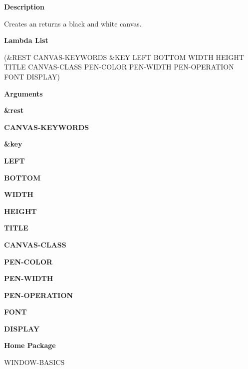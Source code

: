  
{\bf Description}

Creates an returns a black and white canvas.

 
{\bf Lambda List}

(\&REST CANVAS-KEYWORDS \&KEY LEFT BOTTOM WIDTH HEIGHT TITLE CANVAS-CLASS PEN-COLOR PEN-WIDTH PEN-OPERATION FONT DISPLAY)

 
{\bf Arguments}


\beginhang
{\bf \&rest}\hspace{2em}
 
{\bf CANVAS-KEYWORDS}


 
\endhang
\beginhang
{\bf \&key}\hspace{2em}
 
{\bf LEFT}


 
{\bf BOTTOM}


 
{\bf WIDTH}


 
{\bf HEIGHT}


 
{\bf TITLE}


 
{\bf CANVAS-CLASS}


 
{\bf PEN-COLOR}


 
{\bf PEN-WIDTH}


 
{\bf PEN-OPERATION}


 
{\bf FONT}


 
{\bf DISPLAY}


 
\endhang
 
{\bf Home Package}

WINDOW-BASICS

